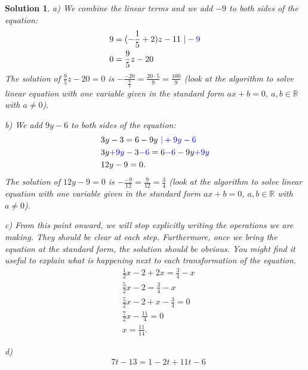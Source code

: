 \documentclass[12pt]{article}
\newtheorem{sol}[prop]{Solution}
\begin{document}
\begin{sol}
\item[a)] We combine the linear terms and we add $-9$ to both sides of the equation:
\begin{equation*}
\begin{split}
& 9=(-\frac{1}{5}+2)z-11\textcolor{blue}{\ | -9}\\
& 0=\frac{9}{5}z-20
\end{split}
\end{equation*}
The solution of $\frac{9}{5}z-20=0$ is $-\frac{-20}{\frac{9}{5}}=\frac{20\cdot 5}{9}=\frac{100}{9}$ (look at the algorithm to solve linear equation with one variable given in the standard form $ax+b=0$, $a,b\in \mathbb{R}$ with $a\neq 0$).
\item[b)] We add $9y-6$ to both sides of the equation:
\begin{equation*}
\begin{split}
& 3y-3=6-9y\textcolor{blue}{\ | +9y-6}\\
& 3y\textcolor{blue}{+9y}-3\textcolor{blue}{-6}=6\textcolor{blue}{-6}-9y\textcolor{blue}{+9y}\\
& 12y-9=0.
\end{split}
\end{equation*}
The solution of $12y-9=0$ is $-\frac{-9}{12}=\frac{9}{12}=\frac{3}{4}$ (look at the algorithm to solve linear equation with one variable given in the standard form $ax+b=0$, $a,b\in \mathbb{R}$ with $a\neq 0$).
\item[c)] From this point onward, we will stop explicitly writing the operations we are making. They should be clear at each step. Furthermore, once we bring the equation at the standard form, the solution should be obvious. You might find it useful to explain what is happening next to each transformation of the equation.
\begin{equation*}
\begin{split}
& \frac{1}{2}x-2+2x=\frac{3}{4}-x\\
& \frac{5}{2}x-2=\frac{3}{4}-x\\
& \frac{5}{2}x-2+x-\frac{3}{4}=0\\
& \frac{7}{2}x-\frac{11}{4}=0\\
& x= \frac{11}{14}.
\end{split}
\end{equation*}
\item[d)] \begin{equation*}
\begin{split}
& 7t-13=1-2t+11t-6\\

\end{split}
\end{equation*}
\end{sol}
\end{document}
